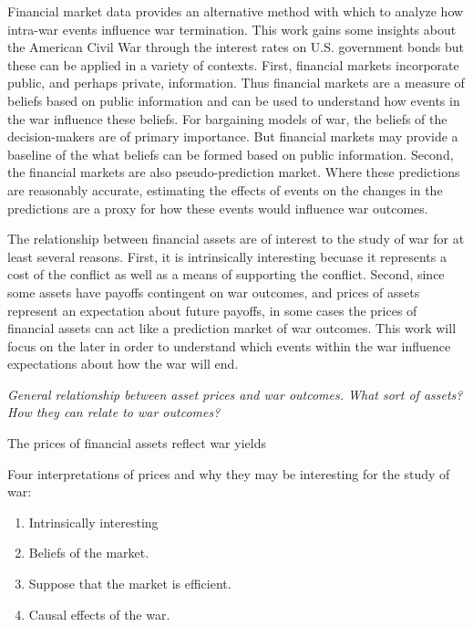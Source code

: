 
Financial market data provides an alternative method with which to analyze how intra-war events influence war termination.
This work gains some insights about the American Civil War through the interest rates on U.S. government bonds but these can be applied in a variety of contexts.
First, financial markets incorporate public, and perhaps private, information.
Thus financial markets are a measure of beliefs based on public information and can be used to understand how events in the war influence these beliefs.
For bargaining models of war, the beliefs of the decision-makers are of primary importance.
But financial markets may provide a baseline of the what beliefs can be formed based on public information.
Second, the financial markets are also pseudo-prediction market.
Where these predictions are reasonably accurate, estimating the effects of events on the changes in the predictions are a proxy for how these events would influence war outcomes.

The relationship between financial assets are of interest to the study of war for at least several reasons.
First, it is intrinsically interesting becuase it represents a cost of the conflict as well as a means of supporting the conflict.
Second, since some assets have payoffs contingent on war outcomes, and prices of assets represent an expectation about future payoffs, in some cases the prices of financial assets can act like a prediction market of war outcomes.
This work will focus on the later in order to understand which events within the war influence expectations about how the war will end.

\textit{General relationship between asset prices and war outcomes. What sort of assets? How they can relate to war outcomes?}

The prices of financial assets reflect war yields 

Four interpretations of prices and why they may be interesting for the study of war:

\begin{enumerate}
\item Intrinsically interesting
\item Beliefs of the market.
\item Suppose that the market is efficient.
\item Causal effects of the war.
\end{enumerate}


